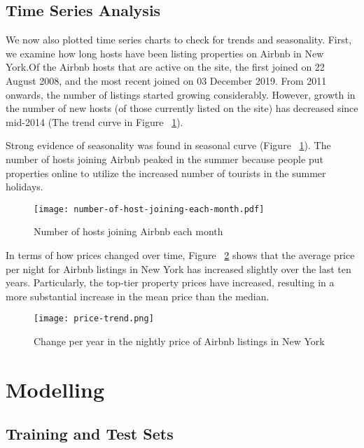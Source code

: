 \subsection{Time Series Analysis}
\label{sec:time_series}

We now also plotted time series charts to check for trends and seasonality.
First, we examine how long hosts have been listing properties on Airbnb in New
York.Of the Airbnb hosts that are active on the site, the first joined on 22
August 2008, and the most recent joined on 03 December 2019.
From 2011 onwards, the number of listings started growing considerably. However,
growth in the number of new hosts (of those currently listed on the site) has
decreased since mid-2014 (The trend curve in Figure
~\ref{fig:number_of_hosts_joining}).

Strong evidence of seasonality was found in  seasonal curve (Figure
~\ref{fig:number_of_hosts_joining}). The number of hosts joining Airbnb peaked in
the summer because people put properties online to utilize the increased number
of tourists in the summer holidays.


\begin{figure}[!htbp] \centering
    \texttt{[image: number-of-host-joining-each-month.pdf]}
    \caption{Number of hosts joining Airbnb each month}
    \label{fig:number_of_hosts_joining}
\end{figure}

In terms of how prices changed over time, Figure
~\ref{fig:prices-change-by-years} shows that the average price per night for
Airbnb listings in New York has increased slightly over the
last ten years. Particularly, the top-tier property prices have increased,
resulting in a more substantial increase in the mean price than the median.


\begin{figure}[!htbp] \centering
    \texttt{[image: price-trend.png]}
    \caption{Change per year in the nightly price of Airbnb listings in New York}
    \label{fig:prices-change-by-years}
\end{figure}


\section{Modelling}

\subsection{Training and Test Sets}
\label{sec:train_test_split}

